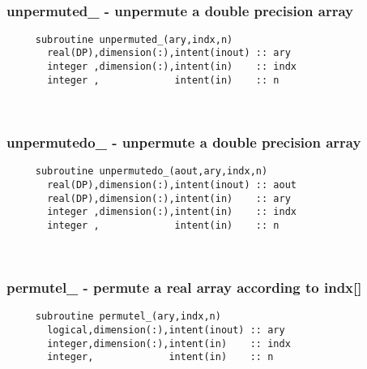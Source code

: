  
\mbox{}\hrulefill\ 
 
  \subsubsection{unpermuted\_ - unpermute a double precision array}

\begin{verbatim} 
     subroutine unpermuted_(ary,indx,n)
       real(DP),dimension(:),intent(inout) :: ary
       integer ,dimension(:),intent(in)    :: indx
       integer ,             intent(in)    :: n
 \end{verbatim}%
 
 
\mbox{}\hrulefill\ 

  \subsubsection{unpermutedo\_ - unpermute a double precision array}

\begin{verbatim} 
     subroutine unpermutedo_(aout,ary,indx,n)
       real(DP),dimension(:),intent(inout) :: aout
       real(DP),dimension(:),intent(in)    :: ary
       integer ,dimension(:),intent(in)    :: indx
       integer ,             intent(in)    :: n
 \end{verbatim}%
 
 
\mbox{}\hrulefill\ 
 

  \subsubsection{permutel\_ - permute a real array according to indx[]}

\begin{verbatim} 
     subroutine permutel_(ary,indx,n)
       logical,dimension(:),intent(inout) :: ary
       integer,dimension(:),intent(in)    :: indx
       integer,             intent(in)    :: n
 \end{verbatim}%
 
